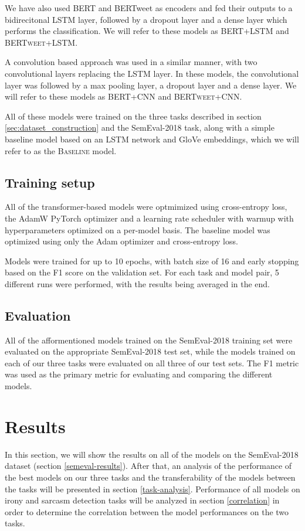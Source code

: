 \documentclass[10pt, a4paper]{article}
\begin{document}
We have also used BERT and BERTweet as encoders and fed their outputs to a bidirecitonal LSTM layer, followed by 
a dropout layer and a dense layer which performs the classification. We will refer to these models as \textsc{BERT+LSTM}
and \textsc{BERTweet+LSTM}. 

A convolution based approach was used in a similar manner, with two convolutional layers
replacing the LSTM layer. In these models, the convolutional layer was followed by a max pooling layer, a dropout layer
and a dense layer. We will refer to these models as \textsc{BERT+CNN} and \textsc{BERTweet+CNN}.

All of these models were trained on the three tasks described in section \ref{sec:dataset_construction} and the SemEval-2018
task, along with a simple baseline model based on an LSTM network and GloVe embeddings, which we will refer to as the
\textsc{Baseline} model. 

\subsection{Training setup}
All of the transformer-based models were optmimized using cross-entropy loss, the AdamW PyTorch optimizer and a
learning rate scheduler with warmup with hyperparameters optimized on a per-model basis. The baseline model
was optimized using only the Adam optimizer and cross-entropy loss.

Models were trained for up to 10 epochs, with batch size of 16 and early stopping based on the F1 score on the validation set.
For each task and model pair, 5 different runs were performed, with the results being averaged in the end.

\subsection{Evaluation}
All of the afformentioned models trained on the SemEval-2018 training set were evaluated on the appropriate 
SemEval-2018 test set, while the models trained on each of our three tasks were evaluated on all three of our test sets. 
The F1 metric was used as the primary metric for evaluating and comparing the different models.

\section{Results}

In this section, we will show the results on all of the models on the SemEval-2018 dataset (section \ref{semeval-results}).
After that, an analysis of the performance of the best models on our three tasks and the transferability of the models between
the tasks will be presented in section \ref{task-analysis}. Performance of all models on irony and sarcasm detection tasks
will be analyzed in section \ref{correlation} in order to determine the correlation between the model performances on the two tasks.
\end{document}
